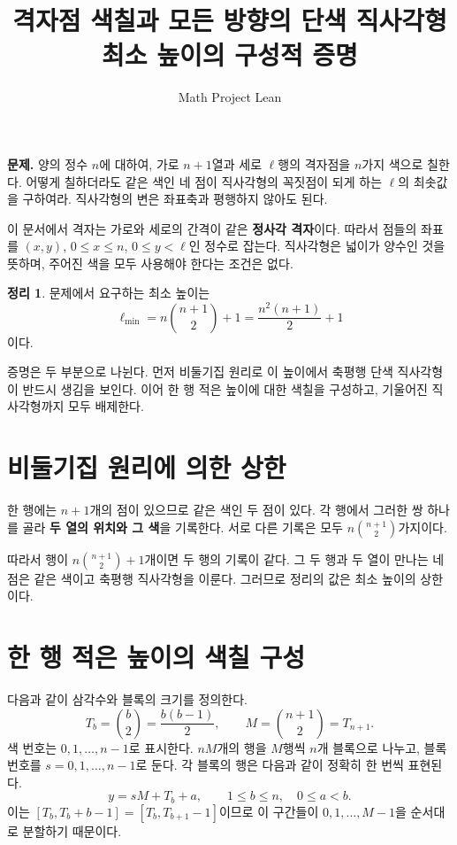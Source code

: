 \documentclass[a4paper,11pt]{article}
\title{격자점 색칠과 모든 방향의 단색 직사각형\\[0.3em]
  \large 최소 높이의 구성적 증명}
\author{Math Project Lean}
\date{}
\theoremstyle{definition}
\newtheorem{theorem}{정리}
\begin{document}
\maketitle
\vspace{-1.2em}

\noindent\textbf{문제.}
양의 정수 $n$에 대하여, 가로 $n+1$열과 세로 $\ell$행의 격자점을
$n$가지 색으로 칠한다. 어떻게 칠하더라도 같은 색인 네 점이 직사각형의
꼭짓점이 되게 하는 $\ell$의 최솟값을 구하여라.
직사각형의 변은 좌표축과 평행하지 않아도 된다.

이 문서에서 격자는 가로와 세로의 간격이 같은 \textbf{정사각 격자}이다.
따라서 점들의 좌표를 $(x,y)$, $0\le x\le n$, $0\le y<\ell$인 정수로
잡는다. 직사각형은 넓이가 양수인 것을 뜻하며, 주어진 색을 모두 사용해야
한다는 조건은 없다.

\begin{theorem}\label{thm:main}
문제에서 요구하는 최소 높이는
\[
  \boxed{\ell_{\min}=n\binom{n+1}{2}+1
  =\frac{n^2(n+1)}{2}+1}
\]
이다.
\end{theorem}

증명은 두 부분으로 나뉜다. 먼저 비둘기집 원리로 이 높이에서 축평행
단색 직사각형이 반드시 생김을 보인다. 이어 한 행 적은 높이에 대한
색칠을 구성하고, 기울어진 직사각형까지 모두 배제한다.

\section{비둘기집 원리에 의한 상한}

한 행에는 $n+1$개의 점이 있으므로 같은 색인 두 점이 있다.
각 행에서 그러한 쌍 하나를 골라 \textbf{두 열의 위치와 그 색}을 기록한다.
서로 다른 기록은 모두 $n\binom{n+1}{2}$가지이다.

따라서 행이 $n\binom{n+1}{2}+1$개이면 두 행의 기록이 같다.
그 두 행과 두 열이 만나는 네 점은 같은 색이고 축평행 직사각형을 이룬다.
그러므로 정리의 값은 최소 높이의 상한이다.

\section{한 행 적은 높이의 색칠 구성}

다음과 같이 삼각수와 블록의 크기를 정의한다.
\[
  T_b=\binom b2=\frac{b(b-1)}2,
  \qquad M=\binom{n+1}{2}=T_{n+1}.
\]
색 번호는 $0,1,\ldots,n-1$로 표시한다. $nM$개의 행을 $M$행씩 $n$개
블록으로 나누고, 블록 번호를 $s=0,1,\ldots,n-1$로 둔다.
각 블록의 행은 다음과 같이 정확히 한 번씩 표현된다.
\[
  y=sM+T_b+a,\qquad 1\le b\le n,\quad 0\le a<b.
\]
이는 $[T_b,T_b+b-1]=[T_b,T_{b+1}-1]$이므로 이 구간들이
$0,1,\ldots,M-1$을 순서대로 분할하기 때문이다.
\end{document}
